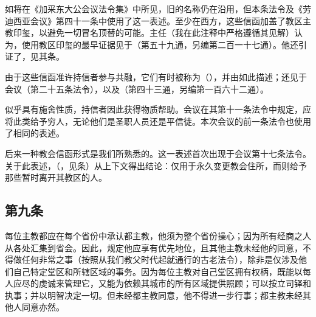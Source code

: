 如将在《加采东大公会议法令集》中所见，旧的名称仍在沿用，但本条法令及《劳迪西亚会议》第四十一条中使用了这一表述。至少在西方，这些信函加盖了教区主教印玺，以避免一切冒名顶替的可能。主任（我在此注释中严格遵循其见解）认为，使用教区印玺的最早证据见于（第五十九通，另编第二百一十七通）。他还引证了，见其条。\par

由于这些信函准许持信者参与共融，它们有时被称为（），并由如此描述；还见于会议（第二十五条法令），以及（第四十三通，另编第一百六十二通）。\par

似乎具有施舍性质，持信者因此获得物质帮助。会议在其第十一条法令中规定，应将此类给予穷人，无论他们是圣职人员还是平信徒。本次会议的前一条法令也使用了相同的表述。\par

后来一种教会信函形式是我们所熟悉的。这一表述首次出现于会议第十七条法令。关于此表述，（，见条）从上下文得出结论：仅用于永久变更教会住所，而则给予那些暂时离开其教区的人。\par


\subsection{第九条}

每位主教都应在每个省份中承认都主教，他须为整个省份操心；因为所有经商之人从各处汇集到省会。因此，规定他应享有优先地位，且其他主教未经他的同意，不得做任何非常之事（按照从我们教父时代起就通行的古老法令），除非是仅涉及他们自己特定堂区和所辖区域的事务。因为每位主教对自己堂区拥有权柄，既能以每人应尽的虔诚来管理它，又能为依赖其城市的所有区域提供照顾；可以按立司铎和执事；并以明智决定一切。但未经都主教同意，他不得进一步行事；都主教未经其他人同意亦然。\par

\par

